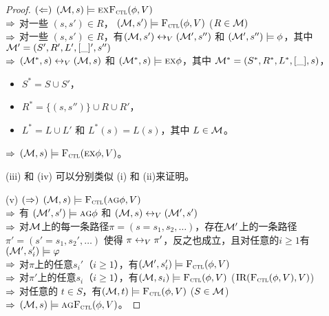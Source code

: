 \begin{proof}
	$(\Leftarrow)$ $({\cal M},s)\models\textsc{e} \textsc{x}{\textsc{F}_{\textsc{ctl}}}(\phi,V)$\\
	$\Rightarrow$ 对一些 $(s,s')\in R$， $({\cal M},s')\models{\textsc{F}_{\textsc{ctl}}}(\phi,V)$ ($R\in {\cal M})$\\
	$\Rightarrow$ 对一些 $(s,s')\in R$，有$({\cal M},s')\leftrightarrow_V({\cal M}',s'')$ 和 $({\cal M}',s'')\models\phi$，其中 ${\cal M}'=(S',R',L',[\_]',s'')$ \\
	$\Rightarrow$ $({\cal M}^*,s)\leftrightarrow_V({\cal M},s)$ 和 $({\cal M}^*,s)\models\textsc{e}\textsc{x}\phi$，其中
	${\cal M}^*=(S^*,R^*,L^*,[\_], s)$，
	\begin{itemize}
		\item $S^*=S\cup S'$，
		\item $R^*=\{(s,s'')\}\cup R \cup R'$，
		\item $L^*= L \cup L'$ 和 $L^*(s)=L(s)$，其中 $L\in{\cal M}$。
	\end{itemize}
	$\Rightarrow$ $({\cal M},s)\models {\textsc{F}_{\textsc{ctl}}}(\textsc{e}\textsc{x}\phi,V)$。
	

	
	
	(iii) 和 (iv) 可以分别类似 (i) 和 (ii)来证明。
	
	(v) $(\Rightarrow)$ $({\cal M},s) \models {\textsc{F}_{\textsc{ctl}}}(\textsc{a} \textsc{g} \phi, V)$\\
	$\Rightarrow$ 有 $({\cal M}',s') \models \textsc{a} \textsc{g} \phi$ 和 $({\cal M},s) \leftrightarrow_V ({\cal M}',s')$\\
	$\Rightarrow$ 对${\cal M}$上的每一条路径$\pi=(s=s_1, s_2, \dots)$，存在${\cal M}'$上的一条路径$\pi'=(s'=s_1, s_2', \dots)$ 使得 $\pi \leftrightarrow_V \pi'$，反之也成立，且对任意的$i\geq 1$有 $({\cal M}', s_i') \models \varphi$\\ 
	$\Rightarrow$ 对$\pi$上的任意$s_i'$（$i\geq 1$），有$({\cal M}',s_i') \models {\textsc{F}_{\textsc{ctl}}}(\phi, V)$\\
	$\Rightarrow$ 对$\pi'$上的任意$s_i$（$i\geq 1$），有$({\cal M},s_i) \models {\textsc{F}_{\textsc{ctl}}}(\phi, V)$ \hfill ($\textrm{IR}({\textsc{F}_{\textsc{ctl}}}(\phi, V), V)$)\\
	$\Rightarrow$ 对任意的 $t \in S$，有$({\cal M},t) \models {\textsc{F}_{\textsc{ctl}}}(\phi, V)$ \quad ($S\in {\cal M}$)\\
	$\Rightarrow$ $({\cal M},s) \models \textsc{a} \textsc{g} {\textsc{F}_{\textsc{ctl}}}(\phi, V)$。
	

\end{proof}
